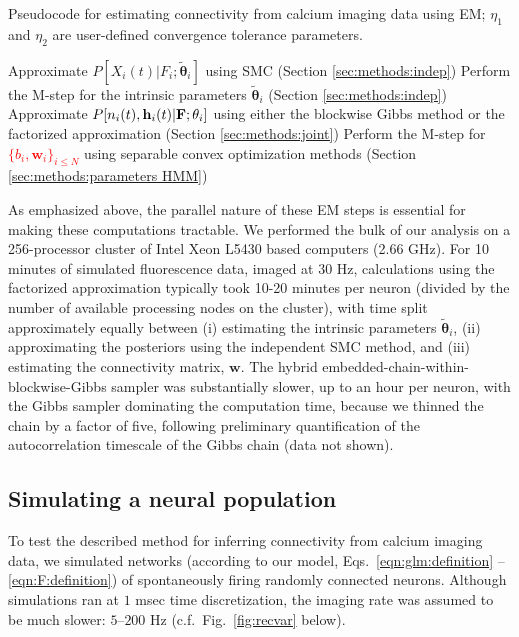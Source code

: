 \documentclass[aoas,preprint]{imsart}
\providecommand{\tr}[1]{\textcolor{red}{#1}}
\newcommand{\bth}{\mathbf{\theta}}
\newcommand{\w}{w}
\newcommand{\bw}{\mathbf{\w}}
\newcommand{\bF}{{\bf F}}
\newcommand{\bh}{\mathbf{h}}
\newcommand{\tbth}{\tilde{\bth}}
\begin{document}
\begin{algorithm}[t!]
\caption{Pseudocode for estimating connectivity from
calcium imaging data using EM; $\eta_1$ and $\eta_2$ are
user-defined convergence tolerance parameters.}
\label{eqn:pseudocode}
\begin{algorithmic}
\While{$|{\bw}^{(l)}-{\bw}^{(l-1)}|>\eta_1$}
    \While{$|{\tbth_i}^{(l)}-{\tbth_i}^{(l-1)}|> \eta_2$}
      \State Approximate $P[X_i(t)|F_i; \tbth_i]$ using SMC (Section \ref{sec:methods:indep})
      \State Perform the M-step for the intrinsic parameters $\tbth_i$ (Section \ref{sec:methods:indep})
    \EndWhile
  \EndFor
      \State Approximate $P[n_i(t), \bh_i(t) |\bF; \bth_i]$ using either the blockwise Gibbs
      \State method or the factorized approximation (Section \ref{sec:methods:joint})
    \EndFor
  	\State Perform the M-step for \tr{$\{b_i, \bw_i\}_{i\leq N}$} using separable convex optimization methods (Section \ref{sec:methods:parameters HMM})
  \EndFor
\EndWhile
\end{algorithmic}
\end{algorithm}

As emphasized above, the parallel nature of these EM steps is
essential for making these computations tractable. We performed the
bulk of our analysis on a 256-processor cluster of Intel Xeon L5430
based computers (2.66 GHz). For 10 minutes of simulated fluorescence
data, imaged at $30$ Hz, calculations using the factorized
approximation typically took 10-20 minutes per neuron (divided by the
number of available processing nodes on the cluster), with time split
approximately equally between (i) estimating the intrinsic parameters
$\tbth_i $, (ii) approximating the posteriors using the independent
SMC method, and (iii) estimating the connectivity matrix,
$\bw$. The hybrid embedded-chain-within-blockwise-Gibbs sampler was
substantially slower, up to an hour per neuron, with the Gibbs sampler
dominating the computation time, because we thinned the chain by a
factor of five, following preliminary quantification of the
autocorrelation timescale of the Gibbs chain (data not shown).


\subsection{Simulating a neural population} \label{sec:results:simulations}

To test the described method for inferring connectivity
from calcium imaging data, we simulated networks (according to our
model, Eqs.~\eqref{eqn:glm:definition} -- \eqref{eqn:F:definition}) of
spontaneously firing randomly connected neurons. Although simulations
ran at $1$ msec time discretization, the imaging rate was assumed to
be much slower: $5$--$200$ Hz (c.f.~Fig.~\ref{fig:recvar} below).
\end{document}
